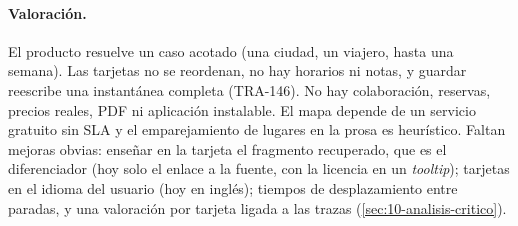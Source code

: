 \paragraph{Valoración.} El producto resuelve un caso acotado (una ciudad, un viajero, hasta
una semana). Las tarjetas no se reordenan, no hay horarios ni notas, y guardar reescribe una
instantánea completa (TRA-146). No hay colaboración, reservas, precios reales, PDF ni aplicación
instalable. El mapa depende de un servicio gratuito sin SLA y el emparejamiento de lugares en la prosa es heurístico. Faltan mejoras obvias: enseñar en la
tarjeta el fragmento recuperado, que es el diferenciador (hoy solo el enlace a la fuente, con la
licencia en un \emph{tooltip}); tarjetas en el idioma del usuario (hoy en inglés); tiempos de
desplazamiento entre paradas, y una valoración por tarjeta ligada a las trazas
(\cref{sec:10-analisis-critico}).
